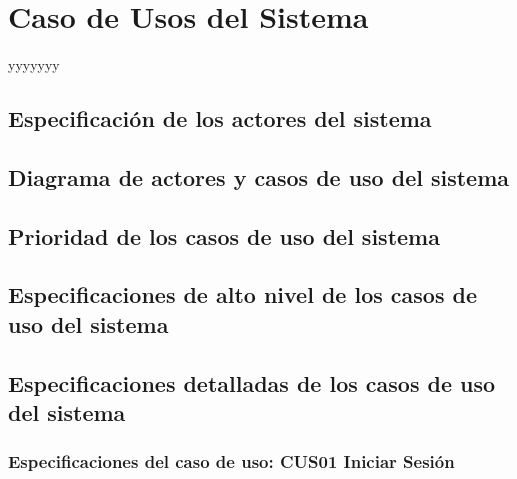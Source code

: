 ﻿\chapter{Caso de Usos del Sistema}
yyyyyyy

\section{Especificación de los actores del sistema}

\section{Diagrama de actores y casos de uso del sistema}

\section{Prioridad de los casos de uso del sistema}

\section{Especificaciones de alto nivel de los casos de uso del sistema}

\section{Especificaciones detalladas de los casos de uso del sistema}

\subsection{Especificaciones del caso de uso: CUS01 Iniciar Sesión}
